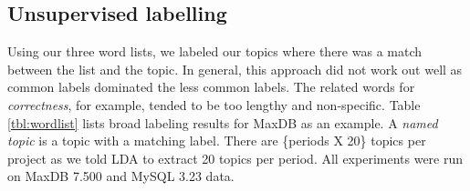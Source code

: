 \documentclass[]{sig-alternate}
\begin{document}


\subsection{Unsupervised labelling}
Using our three word lists, we labeled our topics where there was a match between the list and the topic. In general, this approach did not work out well as common labels dominated the less common labels. The related words for \emph{correctness}, for example, tended to be too lengthy and non-specific. 
Table \ref{tbl:wordlist} lists broad labeling results for MaxDB as an example. A \emph{named topic} is a topic with a matching label. There are \{periods X 20\} topics per project as we told LDA to extract 20 topics per period. All experiments were run on MaxDB 7.500 and MySQL 3.23 data.
\end{document}
